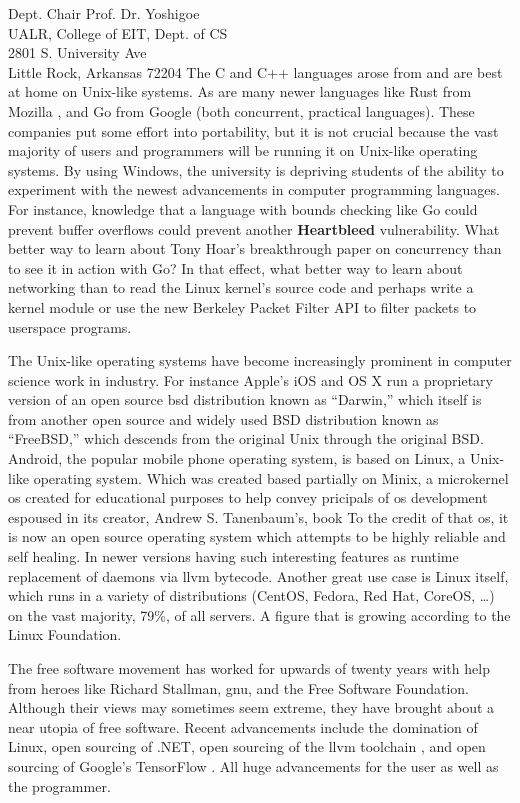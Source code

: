 \documentclass{letter}
\begin{document}
\begin{letter}{
    Dept. Chair Prof. Dr. Yoshigoe \\
    UALR, College of EIT, Dept. of CS \\
    2801 S. University Ave \\
    Little Rock, Arkansas 72204
  }
    The C and C++ languages arose from and are best at home on Unix-like systems. As are many newer languages like Rust from Mozilla \cite{RustLang}, and Go from Google \cite{Golang} (both concurrent, practical languages). These companies put some effort into portability, but it is not crucial because the vast majority of users and programmers will be running it on Unix-like operating systems. By using Windows, the university is depriving students of the ability to experiment with the newest advancements in computer programming languages. For instance, knowledge that a language with bounds checking like Go could prevent buffer overflows could prevent another {\bf Heartbleed} vulnerability. What better way to learn about Tony Hoar's breakthrough paper on concurrency than to see it in action with Go? In that effect, what better way to learn about networking than to read the Linux kernel's source code and perhaps write a kernel module or use the new Berkeley Packet Filter API to filter packets to userspace programs.

    The Unix-like operating systems have become increasingly prominent in computer science work in industry. For instance Apple's iOS and OS X run a proprietary version of an open source \gls{bsd} distribution known as ``Darwin,'' which itself is from another open source and widely used BSD distribution known as ``FreeBSD,'' which descends from the original Unix through the original BSD. Android, the popular mobile phone operating system, is based on Linux, a Unix-like operating system. Which was created based partially on Minix, a microkernel \gls{os} created for educational purposes to help convey pricipals of \gls{os} development espoused in its creator, Andrew S. Tanenbaum's, book \cite{Tanenbaum:2005:OSD:1076555} To the credit of that \gls{os}, it is now an open source operating system which attempts to be highly reliable and self healing. In newer versions having such interesting features as runtime replacement of daemons via \gls{llvm} bytecode. Another great use case is Linux itself, which runs in a variety of distributions (CentOS, Fedora, Red Hat, CoreOS, \ldots) on the vast majority, 79\%, of all servers. A figure that is growing according to the Linux Foundation.

    The free software movement has worked for upwards of twenty years with help from heroes like Richard Stallman, \gls{gnu}, and the Free Software Foundation. Although their views may sometimes seem extreme, they have brought about a near utopia of free software. Recent advancements include the domination of Linux, open sourcing of .NET, open sourcing of the \gls{llvm} toolchain \cite{LLVMComp}, and open sourcing of Google's TensorFlow \cite{WiredTensorFlow}. All huge advancements for the user as well as the programmer.


\end{letter}
\end{document}
